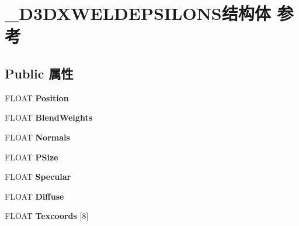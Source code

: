 \hypertarget{struct___d3_d_x_w_e_l_d_e_p_s_i_l_o_n_s}{}\section{\+\_\+\+D3\+D\+X\+W\+E\+L\+D\+E\+P\+S\+I\+L\+O\+N\+S结构体 参考}
\label{struct___d3_d_x_w_e_l_d_e_p_s_i_l_o_n_s}
\subsection*{Public 属性}
\begin{DoxyCompactItemize}
\item 
\mbox{\label{struct___d3_d_x_w_e_l_d_e_p_s_i_l_o_n_s_abaa8fad7e98f140a6d43828c0dfebd4a}} 
F\+L\+O\+AT {\bfseries Position}
\item 
\mbox{\label{struct___d3_d_x_w_e_l_d_e_p_s_i_l_o_n_s_a3787879ed9c62e3a63b38ae97a8cd622}} 
F\+L\+O\+AT {\bfseries Blend\+Weights}
\item 
\mbox{\label{struct___d3_d_x_w_e_l_d_e_p_s_i_l_o_n_s_a047f4495e4615defad16131199a8ddfc}} 
F\+L\+O\+AT {\bfseries Normals}
\item 
\mbox{\label{struct___d3_d_x_w_e_l_d_e_p_s_i_l_o_n_s_a5b3352fbc981631066f8d750c72f8b67}} 
F\+L\+O\+AT {\bfseries P\+Size}
\item 
\mbox{\label{struct___d3_d_x_w_e_l_d_e_p_s_i_l_o_n_s_afc409a122c4192a705402906829cf91e}} 
F\+L\+O\+AT {\bfseries Specular}
\item 
\mbox{\label{struct___d3_d_x_w_e_l_d_e_p_s_i_l_o_n_s_a5753ce37a4822e5202903a02507059a0}} 
F\+L\+O\+AT {\bfseries Diffuse}
\item 
\mbox{\label{struct___d3_d_x_w_e_l_d_e_p_s_i_l_o_n_s_a28a92439e858d6829ce502f5fe3eded9}} 
F\+L\+O\+AT {\bfseries Texcoords} \mbox{[}8\mbox{]}
\item 
\mbox{\label{struct___d3_d_x_w_e_l_d_e_p_s_i_l_o_n_s_a09a29afe20c52eae64b061f699462e34}} 

\end{DoxyCompactItemize}
